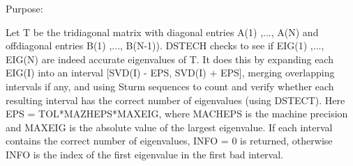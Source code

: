 \begin{DoxyParagraph}{Purpose\+: }
\begin{DoxyVerb}    Let T be the tridiagonal matrix with diagonal entries A(1) ,...,
    A(N) and offdiagonal entries B(1) ,..., B(N-1)).  DSTECH checks to
    see if EIG(1) ,..., EIG(N) are indeed accurate eigenvalues of T.
    It does this by expanding each EIG(I) into an interval
    [SVD(I) - EPS, SVD(I) + EPS], merging overlapping intervals if
    any, and using Sturm sequences to count and verify whether each
    resulting interval has the correct number of eigenvalues (using
    DSTECT).  Here EPS = TOL*MAZHEPS*MAXEIG, where MACHEPS is the
    machine precision and MAXEIG is the absolute value of the largest
    eigenvalue. If each interval contains the correct number of
    eigenvalues, INFO = 0 is returned, otherwise INFO is the index of
    the first eigenvalue in the first bad interval.\end{DoxyVerb}
 
\end{DoxyParagraph}

